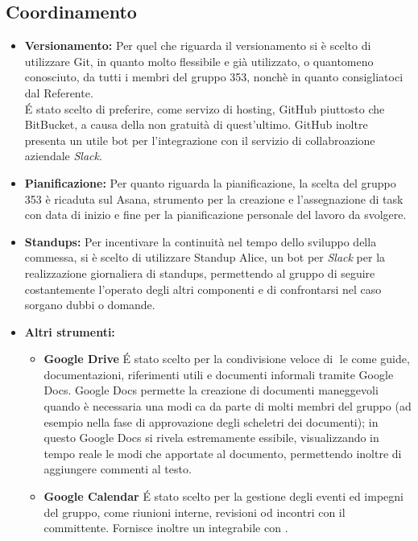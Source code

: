\documentclass[NormeDiProgetto.tex]{subfiles}
\begin{document}
	\subsection{Coordinamento}
	\begin{itemize}
		\item \textbf{Versionamento:} Per quel che riguarda il versionamento si è scelto di utilizzare Git, in quanto molto flessibile e già utilizzato, o quantomeno conosciuto, da tutti i membri del gruppo 353, nonchè in quanto consigliatoci dal Referente.\\
		\'{E} stato scelto di preferire, come servizo di hosting, GitHub piuttosto che BitBucket, a causa della non gratuità di quest'ultimo. GitHub inoltre presenta un utile bot per l'integrazione con il servizio di collabroazione aziendale \emph{Slack}.
		\item \textbf{Pianificazione:} Per quanto riguarda la pianificazione, la scelta del gruppo 353 è ricaduta sul Asana, strumento per la creazione e l'assegnazione di task con data di inizio e fine per la pianificazione personale del lavoro da svolgere.
		\item \textbf{Standups:} Per incentivare la continuità nel tempo dello sviluppo della commessa, si è scelto di utilizzare Standup Alice, un bot per \emph{Slack} per la realizzazione giornaliera di standups, permettendo al gruppo di seguire costantemente l'operato degli altri componenti e di confrontarsi nel caso sorgano dubbi o domande.
		\item \textbf{Altri strumenti:} 
		\begin{itemize}
			\item \textbf{Google Drive} \'{E} stato scelto per la condivisione veloce di le come
			guide, documentazioni, riferimenti utili e documenti informali tramite
			Google Docs. Google Docs permette la creazione di documenti
			maneggevoli quando è necessaria una modica da parte di molti membri
			del gruppo (ad esempio nella fase di approvazione degli scheletri dei
			documenti); in questo Google Docs si rivela estremamente 
			essibile,
			visualizzando in tempo reale le modiche apportate al documento,
			permettendo inoltre di aggiungere commenti al testo.
			\item \textbf{Google Calendar} \'{E} stato scelto per la gestione degli eventi ed
			impegni del gruppo, come riunioni interne, revisioni od incontri con il committente. Fornisce
			inoltre un  integrabile con .
		\end{itemize}
	\end{itemize}
\end{document}
